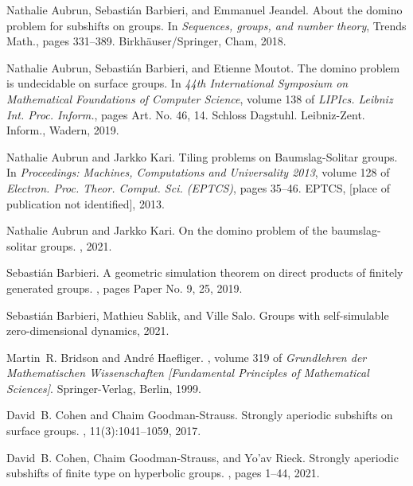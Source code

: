 \documentclass[12pt,reqno]{amsart}
\theoremstyle{plain}
\theoremstyle{definition}
\numberwithin{subcase}{case}
\theoremstyle{plain}
\theoremstyle{definition}
\begin{document}
\begin{thebibliography}{10}

Nathalie Aubrun, Sebasti\'{a}n Barbieri, and Emmanuel Jeandel.
\newblock About the domino problem for subshifts on groups.
\newblock In {\em Sequences, groups, and number theory}, Trends Math., pages
  331--389. Birkh\"{a}user/Springer, Cham, 2018.

Nathalie Aubrun, Sebasti\'{a}n Barbieri, and Etienne Moutot.
\newblock The domino problem is undecidable on surface groups.
\newblock In {\em 44th {I}nternational {S}ymposium on {M}athematical
  {F}oundations of {C}omputer {S}cience}, volume 138 of {\em LIPIcs. Leibniz
  Int. Proc. Inform.}, pages Art. No. 46, 14. Schloss Dagstuhl. Leibniz-Zent.
  Inform., Wadern, 2019.

Nathalie Aubrun and Jarkko Kari.
\newblock Tiling problems on {B}aumslag-{S}olitar groups.
\newblock In {\em Proceedings: {M}achines, {C}omputations and {U}niversality
  2013}, volume 128 of {\em Electron. Proc. Theor. Comput. Sci. (EPTCS)}, pages
  35--46. EPTCS, [place of publication not identified], 2013.

Nathalie Aubrun and Jarkko Kari.
\newblock On the domino problem of the baumslag-solitar groups.
, 2021.

Sebasti\'{a}n Barbieri.
\newblock A geometric simulation theorem on direct products of finitely
  generated groups.
, pages Paper No. 9, 25, 2019.

Sebasti{\'a}n Barbieri, Mathieu Sablik, and Ville Salo.
\newblock Groups with self-simulable zero-dimensional dynamics, 2021.

Martin~R. Bridson and Andr\'{e} Haefliger.
, volume 319 of {\em
  Grundlehren der Mathematischen Wissenschaften [Fundamental Principles of
  Mathematical Sciences]}.
\newblock Springer-Verlag, Berlin, 1999.

David~B. Cohen and Chaim Goodman-Strauss.
\newblock Strongly aperiodic subshifts on surface groups.
, 11(3):1041--1059, 2017.

David~B. Cohen, Chaim Goodman-Strauss, and Yo'av Rieck.
\newblock Strongly aperiodic subshifts of finite type on hyperbolic groups.
, pages 1--44, 2021.


\end{thebibliography}
\end{document}
